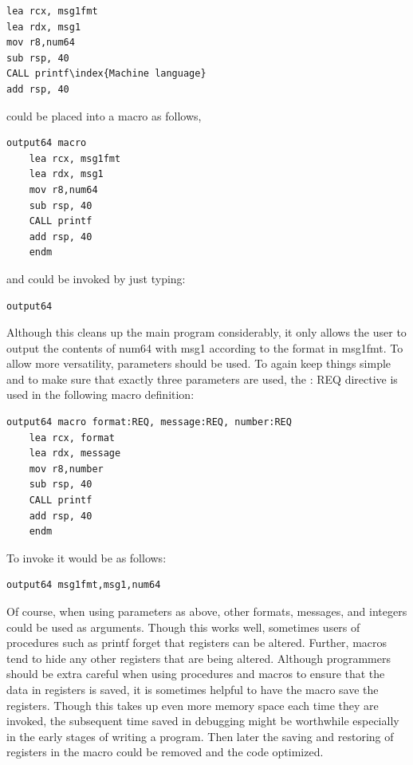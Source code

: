 \documentclass[10pt]{book}
\begin{document}
\begin{verbatim}
lea rcx, msg1fmt
lea rdx, msg1
mov r8,num64
sub rsp, 40
CALL printf\index{Machine language}
add rsp, 40
\end{verbatim}

could be placed into a macro as follows,

\begin{verbatim}
output64 macro
    lea rcx, msg1fmt
    lea rdx, msg1
    mov r8,num64
    sub rsp, 40
    CALL printf
    add rsp, 40
    endm
\end{verbatim}

and could be invoked by just typing:

\begin{verbatim}
output64
\end{verbatim}

Although this cleans up the main program considerably, it only allows the user to output the contents of num64 with msg1 according to the format in msg1fmt. To allow more versatility, parameters should be used. To again keep things simple and to make sure that exactly three parameters are used, the : REQ directive is used in the following macro definition:

\begin{verbatim}
output64 macro format:REQ, message:REQ, number:REQ
    lea rcx, format
    lea rdx, message
    mov r8,number
    sub rsp, 40
    CALL printf
    add rsp, 40
    endm
\end{verbatim}

To invoke it would be as follows:

\begin{verbatim}
output64 msg1fmt,msg1,num64
\end{verbatim}

Of course, when using parameters as above, other formats, messages, and integers could be used as arguments. Though this works well, sometimes users of procedures such as printf forget that registers can be altered. Further, macros tend to hide any other registers that are being altered. Although programmers should be extra careful when using procedures and macros to ensure that the data in registers is saved, it is sometimes helpful to have the macro save the registers. Though this takes up even more memory space each time they are invoked, the subsequent time saved in debugging might be worthwhile especially in the early stages of writing a program. Then later the saving and restoring of registers in the macro could be removed and the code optimized.
\end{document}
